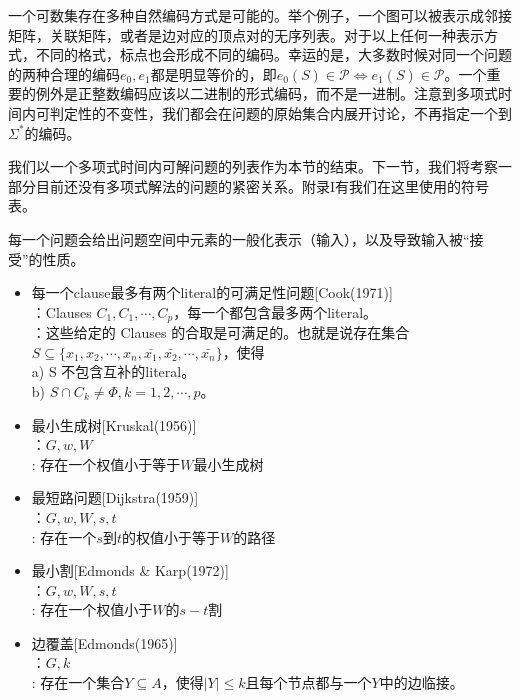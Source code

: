\documentclass[twocolumn]{article}
\theoremstyle{nonumberplain}%
\begin{document}
\begin{CJK}{UTF8}{gbsn}
    一个可数集存在多种自然编码方式是可能的。举个例子，一个图可以被表示成邻接矩阵，关联矩阵，或者是边对应的顶点对的无序列表。对于以上任何一种表示方式，不同的格式，标点也会形成不同的编码。幸运的是，大多数时候对同一个问题的两种合理的编码$e_0,e_1$都是明显等价的，即$e_0(S)\in\mathcal{P}\Leftrightarrow e_1(S)\in\mathcal{P}$。一个重要的例外是正整数编码应该以二进制的形式编码，而不是一进制。注意到多项式时间内可判定性的不变性，我们都会在问题的原始集合内展开讨论，不再指定一个到$\Sigma^*$的编码。

    我们以一个多项式时间内可解问题的列表作为本节的结束。下一节，我们将考察一部分目前还没有多项式解法的问题的紧密关系。附录I有我们在这里使用的符号表。

    每一个问题会给出问题空间中元素的一般化表示（输入），以及导致输入被“接受”的性质。

    \begin{itemize}
    \item
    每一个clause最多有两个literal的可满足性问题[Cook(1971)]\\
    {}：Clauses $C_1,C_1,\cdots,C_p$，每一个都包含最多两个literal。\\
    {}：这些给定的 Clauses 的合取是可满足的。也就是说存在集合$S\subseteq\{x_1,x_2,\cdots,x_n,\bar{x_1},\bar{x_2},\cdots,\bar{x_n}\}$，使得 \\
    a) S 不包含互补的literal。\\
    b) $S\cap C_k \neq \Phi, k = 1,2,\cdots,p$。

    \item 最小生成树[Kruskal(1956)]\\
    {}：$G, w, W$\\
    {}: 存在一个权值小于等于$W$最小生成树

    \item 最短路问题[Dijkstra(1959)]\\
    {}：$G, w, W, s, t$\\
    {}: 存在一个$s$到$t$的权值小于等于$W$的路径

    \item 最小割[Edmonds \& Karp(1972)]\\
    {}：$G, w, W, s, t$\\
    {}: 存在一个权值小于$W$的$s-t$割

    \item 边覆盖[Edmonds(1965)]\\
    {}：$G, k$\\
    {}: 存在一个集合$Y\subseteq A$，使得$|Y|\le k$且每个节点都与一个$Y$中的边临接。


\end{itemize}
\end{CJK}
\end{document}
